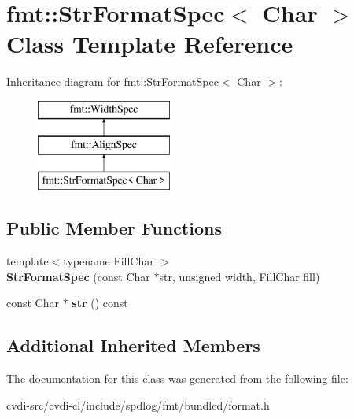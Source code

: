 \hypertarget{classfmt_1_1StrFormatSpec}{}\section{fmt\+:\+:Str\+Format\+Spec$<$ Char $>$ Class Template Reference}
\label{classfmt_1_1StrFormatSpec}
Inheritance diagram for fmt\+:\+:Str\+Format\+Spec$<$ Char $>$\+:\begin{figure}[H]
\begin{center}
\leavevmode
\includegraphics[height=3.000000cm]{classfmt_1_1StrFormatSpec}
\end{center}
\end{figure}
\subsection*{Public Member Functions}
\begin{DoxyCompactItemize}
\item 
{\footnotesize template$<$typename Fill\+Char $>$ }\\{\bfseries Str\+Format\+Spec} (const Char $\ast$str, unsigned width, Fill\+Char fill)\hypertarget{classfmt_1_1StrFormatSpec_a14c888235db04ee0b81197aaccf0a124}{}\label{classfmt_1_1StrFormatSpec_a14c888235db04ee0b81197aaccf0a124}

\item 
const Char $\ast$ {\bfseries str} () const \hypertarget{classfmt_1_1StrFormatSpec_a58da4d50f18458f703dece272f06bda3}{}\label{classfmt_1_1StrFormatSpec_a58da4d50f18458f703dece272f06bda3}

\end{DoxyCompactItemize}
\subsection*{Additional Inherited Members}


The documentation for this class was generated from the following file\+:\begin{DoxyCompactItemize}
\item 
cvdi-\/src/cvdi-\/cl/include/spdlog/fmt/bundled/format.\+h\end{DoxyCompactItemize}
